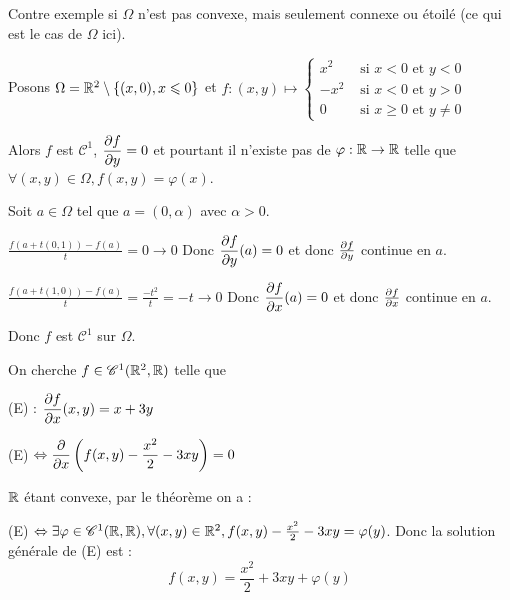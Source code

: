 \begin{exemple}
    Contre exemple si $\Omega$ n'est pas convexe, mais seulement connexe ou étoilé (ce qui est
    le cas de $\Omega$ ici). 

    Posons $\Omega = \mathbb{R}^2 \setminus \{ (x, 0), x \leqslant 0 \} $
    et $f : (x, y) \mapsto \begin{cases}
        x^2 & \text{ si } x < 0 \text{ et } y < 0 \\
        -x^2 & \text{ si } x < 0  \text{ et } y > 0 \\
        0 & \text{ si } x \geqslant 0 \text{ et } y \neq 0 
    \end{cases}$

    Alors $f$ est $\mathscr C^1$, $\displaystyle \frac{\partial f}{\partial y} = 0$ et pourtant il n'existe pas de 
    $\varphi : \mathbb{R} \to \mathbb{R}$ telle que $\forall (x, y) \in \Omega, f(x, y) = \varphi(x)$.

    \avspace Soit $a \in \Omega$ tel que $a = (0, \alpha)$ avec $\alpha > 0$. 

    $\displaystyle \frac{f(a +  t(0, 1)) - f(a)}{t } = 0 \to 0$
    Donc $\displaystyle \frac{\partial f}{\partial y} (a) = 0$ et donc $\frac{\partial f}{\partial y}$ continue en $a$. 

    $\displaystyle \frac{f(a +  t(1, 0)) - f(a)}{t } = \frac{-t^2}{t} = -t \to 0$
    Donc $\displaystyle \frac{\partial f}{\partial x} (a) = 0$ et donc $\frac{\partial f}{\partial x}$ continue en $a$.

    Donc $f$ est $\mathscr C^1$ sur $\Omega$.
\end{exemple}

\begin{exemple}
    On cherche $f \in \mathscr C^1(\mathbb{R}^2, \mathbb{R})$ telle que 

    (E) : $\displaystyle \frac{\partial f}{\partial x} (x, y) = x + 3 y$

    (E) $ \Leftrightarrow \displaystyle \frac{\partial }{\partial x} \left( f(x, y) - \frac{x^2} 2 - 3 xy \right) = 0$

    $\mathbb{R}$ étant convexe, par le théorème on a : 

    (E) $ \Leftrightarrow \exists \varphi \in \mathscr C^1(\mathbb{R}, \mathbb{R}), \forall (x, y) \in \mathbb{R}^2, 
    f(x, y) - \frac{x^2} 2 - 3xy = \varphi(y)$. 
    Donc la solution générale de (E) est :
    $$f(x, y) = \frac{x^2} 2 + 3xy + \varphi(y)$$
\end{exemple}

